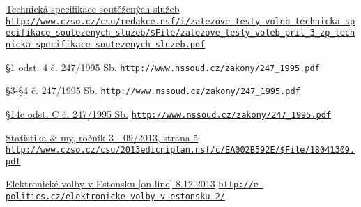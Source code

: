 \documentclass[12pt,a4paper,titlepage,final]{article}
\begin{document}
\begin{thebibliography}{1}
\href{http://www.czso.cz/csu/redakce.nsf/i/zatezove_testy_voleb_technicka_specifikace_soutezenych_sluzeb/$File/zatezove_testy_voleb_pril_3_zp_technicka_specifikace_soutezenych_sluzeb.pdf}{Technická specifikace soutěžených služeb} \newline \href{http://www.czso.cz/csu/redakce.nsf/i/zatezove_testy_voleb_technicka_specifikace_soutezenych_sluzeb/$File/zatezove_testy_voleb_pril_3_zp_technicka_specifikace_soutezenych_sluzeb.pdf}{\nolinkurl{http://www.czso.cz/csu/redakce.nsf/i/zatezove_testy_voleb_technicka_specifikace_soutezenych_sluzeb/$File/zatezove_testy_voleb_pril_3_zp_technicka_specifikace_soutezenych_sluzeb.pdf}}

\href{http://www.nssoud.cz/zakony/247_1995.pdf}{§1 odst. 4 č. 247/1995 Sb.} \newline
\href{http://www.nssoud.cz/zakony/247_1995.pdf}{\nolinkurl{http://www.nssoud.cz/zakony/247_1995.pdf}}

\href{http://www.nssoud.cz/zakony/247_1995.pdf}{§3-§4 č. 247/1995 Sb.} \newline
\href{http://www.nssoud.cz/zakony/247_1995.pdf}{\nolinkurl{http://www.nssoud.cz/zakony/247_1995.pdf}}

\href{http://www.nssoud.cz/zakony/247_1995.pdf}{§14c odst. C č. 247/1995 Sb.} \newline
\href{http://www.nssoud.cz/zakony/247_1995.pdf}{\nolinkurl{http://www.nssoud.cz/zakony/247_1995.pdf}}

\href{http://www.czso.cz/csu/2013edicniplan.nsf/c/EA002B592E/$File/18041309.pdf}{Statistika \& my, ročník 3 - 09/2013, strana 5} \newline
\href{http://www.czso.cz/csu/2013edicniplan.nsf/c/EA002B592E/$File/18041309.pdf}{\nolinkurl{http://www.czso.cz/csu/2013edicniplan.nsf/c/EA002B592E/$File/18041309.pdf}}

\href{http://e-politics.cz/elektronicke-volby-v-estonsku-2/}{Elektronické volby v Estonsku [on-line] 8.12.2013} \newline
\href{http://e-politics.cz/elektronicke-volby-v-estonsku-2/}{\nolinkurl{http://e-politics.cz/elektronicke-volby-v-estonsku-2/}}

\end{thebibliography}
\pagebreak
\appendix

\end{document}

